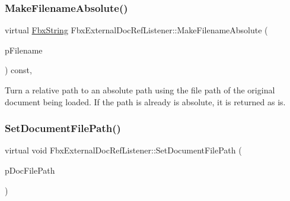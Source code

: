 \mbox{\label{class_fbx_external_doc_ref_listener_a0ccdcffe94bdebb645b119cbb8b8e452}} 
\subsubsection{\texorpdfstring{Make\+Filename\+Absolute()}{MakeFilenameAbsolute()}}
{\footnotesize\ttfamily virtual \hyperlink{class_fbx_string}{Fbx\+String} Fbx\+External\+Doc\+Ref\+Listener\+::\+Make\+Filename\+Absolute (\begin{DoxyParamCaption}\item[{const \hyperlink{class_fbx_string}{Fbx\+String} \&}]{p\+Filename }\end{DoxyParamCaption}) const\hspace{0.3cm}{\ttfamily [protected]}, {\ttfamily [virtual]}}

Turn a relative path to an absolute path using the file path of the original document being loaded. If the path is already is absolute, it is returned as is. \mbox{\label{class_fbx_external_doc_ref_listener_aac019a58c4fda8ce675fb67edb340cbf}} 
\subsubsection{\texorpdfstring{Set\+Document\+File\+Path()}{SetDocumentFilePath()}}
{\footnotesize\ttfamily virtual void Fbx\+External\+Doc\+Ref\+Listener\+::\+Set\+Document\+File\+Path (\begin{DoxyParamCaption}\item[{const \hyperlink{class_fbx_string}{Fbx\+String} \&}]{p\+Doc\+File\+Path }\end{DoxyParamCaption})\hspace{0.3cm}{\ttfamily [virtual]}}

